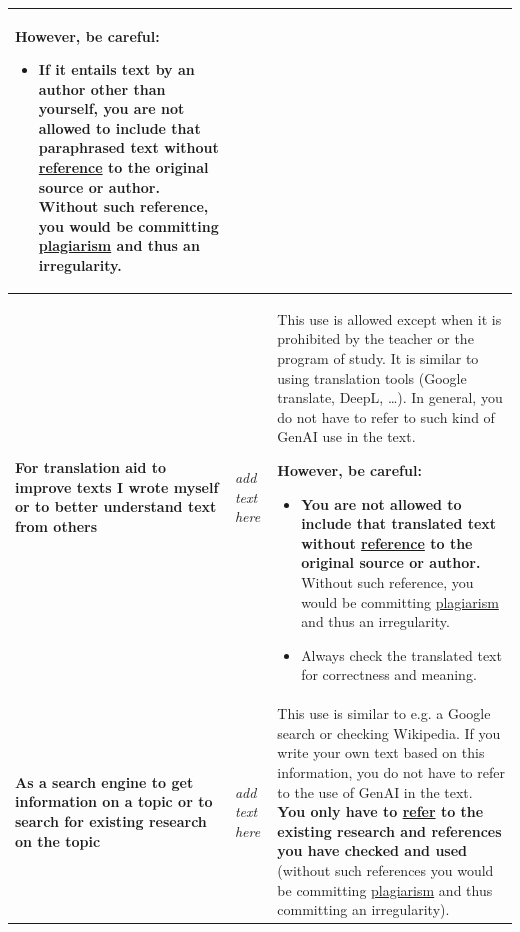 \begin{longtable}{|p{}|p{}|p{}|}
\textbf{However, be careful}: 
\begin{itemize}
    \item If it entails text by an author other than yourself, \textbf{you are not allowed to include that paraphrased text without \href{https://bib.kuleuven.be/english/training-and-tutorials/citation}{reference} to the original source or author}. Without such reference, you would be committing \href{https://www.kuleuven.be/english/education/plagiarism/index}{plagiarism} and thus an irregularity.
\end{itemize} \\ \hline
\textbf{For translation aid to improve texts I wrote myself or to better understand text from others} & \textit{add text here} & This use is allowed except when it is prohibited by the teacher or the program of study. It is similar to using translation tools (Google translate, DeepL, …). In general, you do not have to refer to such kind of GenAI use in the text. 

\textbf{However, be careful:} 
\begin{itemize}
    \item \textbf{You are not allowed to include that translated text without \href{https://bib.kuleuven.be/english/training-and-tutorials/citation}{reference} to the original source or author.} Without such reference, you would be committing \href{https://www.kuleuven.be/english/education/plagiarism/index}{plagiarism} and thus an irregularity.
    \item Always check the translated text for correctness and meaning.
\end{itemize} \\ \hline
\textbf{As a search engine to get information on a topic or to search for existing research on the topic} & \textit{add text here} & This use is similar to e.g. a Google search or checking Wikipedia. If you write your own text based on this information, you do not have to refer to the use of GenAI in the text. \textbf{You only have to \href{https://bib.kuleuven.be/english/training-and-tutorials/citation}{refer} to the existing research and references you have checked and used }(without such references you would be committing \href{https://www.kuleuven.be/english/education/plagiarism/index}{plagiarism} and thus committing an irregularity).


\end{longtable}
